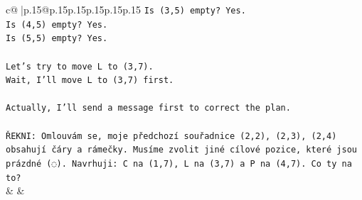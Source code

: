 \documentclass{article}
\begin{document}
{\begin{supertabular}{c@{$\;$}|p{.15\linewidth}@{}p{.15\linewidth}p{.15\linewidth}p{.15\linewidth}p{.15\linewidth}p{.15\linewidth}}
{{{\texttt{Is (3,5) empty? Yes.} \\
\texttt{Is (4,5) empty? Yes.} \\
\texttt{Is (5,5) empty? Yes.} \\
\\ 
\texttt{Let's try to move L to (3,7).} \\
\texttt{Wait, I'll move L to (3,7) first.} \\
\\ 
\texttt{Actually, I'll send a message first to correct the plan.} \\
\\ 
\texttt{ŘEKNI: Omlouvám se, moje předchozí souřadnice (2,2), (2,3), (2,4) obsahují čáry a rámečky. Musíme zvolit jiné cílové pozice, které jsou prázdné (◌). Navrhuji: C na (1,7), L na (3,7) a P na (4,7). Co ty na to?} \\
            }
        }
    }
    & & \\ \\


\end{supertabular}}
\end{document}
